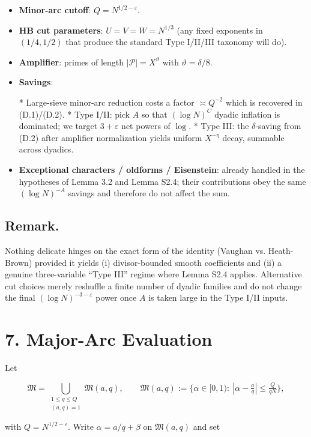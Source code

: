 \documentclass[11pt]{article}
\theoremstyle{definition}
\theoremstyle{remark}
\begin{document}
\begin{itemize}
	\item \textbf{Minor-arc cutoff}: $Q=N^{1/2-\varepsilon}$.
	\item \textbf{HB cut parameters}: $U=V=W=N^{1/3}$ (any fixed exponents in $(1/4,1/2)$ that produce the standard Type I/II/III taxonomy will do).
	\item \textbf{Amplifier}: primes of length $|\mathcal P|=X^\vartheta$ with $\vartheta=\delta/8$.
	\item \textbf{Savings}:

	      * Large-sieve minor-arc reduction costs a factor $\asymp Q^{-2}$ which is recovered in (D.1)/(D.2).
	      * Type I/II: pick $A$ so that $(\log N)^C$ dyadic inflation is dominated; we target $3+\varepsilon$ net powers of $\log$.
	      * Type III: the $\delta$-saving from (D.2) after amplifier normalization yields uniform $X^{-\eta}$ decay, summable across dyadics.
	\item \textbf{Exceptional characters / oldforms / Eisenstein}: already handled in the hypotheses of Lemma 3.2 and Lemma S2.4; their contributions obey the same $(\log N)^{-A}$ savings and therefore do not affect the sum.
\end{itemize}

\subsection*{Remark.}

Nothing delicate hinges on the exact form of the identity (Vaughan vs. Heath-Brown) provided it yields (i) divisor-bounded smooth coefficients and (ii) a genuine three-variable “Type III” regime where Lemma S2.4 applies. Alternative cut choices merely reshuffle a finite number of dyadic families and do not change the final $(\log N)^{-3-\varepsilon}$ power once $A$ is taken large in the Type I/II inputs.

\section*{7. Major-Arc Evaluation}

Let

$$
	\mathfrak M=\bigcup_{\substack{1\le q\le Q\\(a,q)=1}}\mathfrak M(a,q),\qquad
	\mathfrak M(a,q):=\{\alpha\in[0,1):\ |\alpha-\tfrac aq|\le \tfrac{Q}{qN}\},
$$

with $Q=N^{1/2-\varepsilon}$. Write $\alpha=a/q+\beta$ on $\mathfrak M(a,q)$ and set
\end{document}
